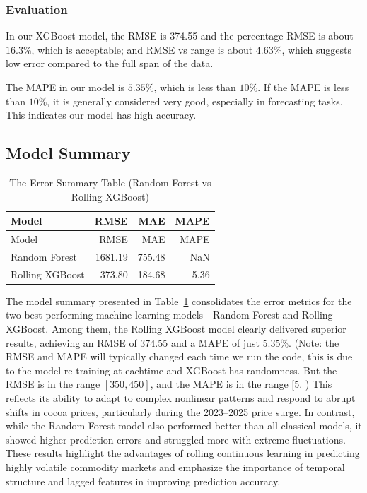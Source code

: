 \documentclass[
  letterpaper,
  DIV=11,
  numbers=noendperiod]{scrartcl}
\begin{document}
\hypertarget{evaluation}{%
\subsubsection{Evaluation}\label{evaluation}}

In our XGBoost model, the RMSE is 374.55 and the percentage RMSE is
about \(16.3\%\), which is acceptable; and RMSE vs range is about
\(4.63\%\), which suggests low error compared to the full span of the
data.

The MAPE in our model is \(5.35\%\), which is less than \(10 \%\). If
the MAPE is less than \(10\%\), it is generally considered very good,
especially in forecasting tasks. This indicates our model has high
accuracy.

\hypertarget{model-summary}{%
\subsection{Model Summary}\label{model-summary}}

\hypertarget{tbl-error-table-2}{}
\begin{longtable}[]{@{}lrrr@{}}
\caption{\label{tbl-error-table-2}The Error Summary Table (Random Forest
vs Rolling XGBoost)}\tabularnewline
\toprule()
Model & RMSE & MAE & MAPE \\
\midrule()
\endfirsthead
\toprule()
Model & RMSE & MAE & MAPE \\
\midrule()
\endhead
Random Forest & 1681.19 & 755.48 & NaN \\
Rolling XGBoost & 373.80 & 184.68 & 5.36 \\
\bottomrule()
\end{longtable}

The model summary presented in Table~\ref{tbl-error-table-2}
consolidates the error metrics for the two best-performing machine
learning models---Random Forest and Rolling XGBoost. Among them, the
Rolling XGBoost model clearly delivered superior results, achieving an
RMSE of 374.55 and a MAPE of just 5.35\%. (Note: the RMSE and MAPE will
typically changed each time we run the code, this is due to the model
re-training at eachtime and XGBoost has randomness. But the RMSE is in
the range \([350, 450]\), and the MAPE is in the range \([5%
\). ) This reflects its ability to adapt to complex nonlinear patterns
and respond to abrupt shifts in cocoa prices, particularly during the
2023--2025 price surge. In contrast, while the Random Forest model also
performed better than all classical models, it showed higher prediction
errors and struggled more with extreme fluctuations. These results
highlight the advantages of rolling continuous learning in predicting
highly volatile commodity markets and emphasize the importance of
temporal structure and lagged features in improving prediction accuracy.
\end{document}
